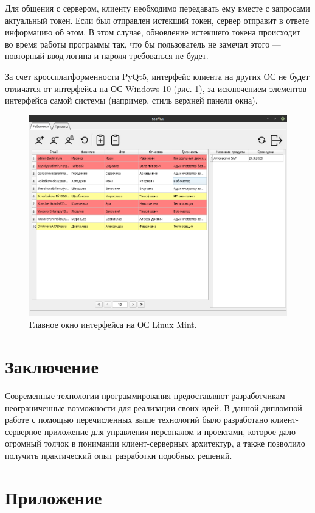 Для общения с сервером, клиенту необходимо передавать ему вместе с запросами актуальный токен.
Если был отправлен истекший токен, сервер отправит в ответе информацию об этом.
В этом случае, обновление истекшего токена происходит во время работы программы так,
что бы пользователь не замечал этого --- повторный ввод логина и пароля требоваться не будет.

За счет кроссплатформенности PyQt5, интерфейс клиента на других ОС не будет отличатся от интерфейса на ОС Windows 10 (рис. \ref{fig:main_window_linux}),
за исключением элементов интерфейса самой системы (например, стиль верхней панели окна).
\begin{figure}[h]
    \centering
    \includegraphics[width=1\linewidth]{img/main_window_linux.png}
    \caption{Главное окно интерфейса на ОС Linux Mint.}
    \label{fig:main_window_linux}
\end{figure}


\clearpage
\section{Заключение}
Современные технологии программирования предоставляют разработчикам неограниченные возможности для реализации своих идей. В данной дипломной работе с помощью перечисленных выше технологий было разработано клиент-серверное приложение для управления персоналом и проектами, которое дало огромный толчок в понимании клиент-серверных архитектур, а также позволило получить практический опыт разработки подобных решений.


\clearpage
\section{Приложение}
